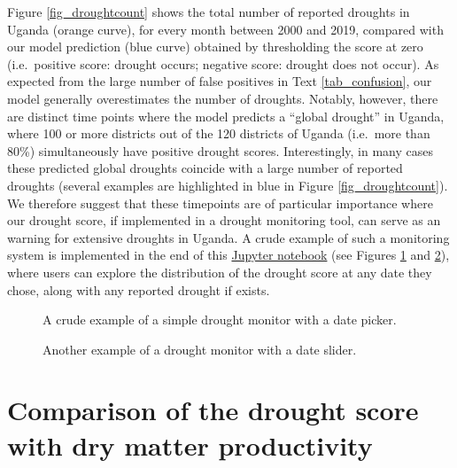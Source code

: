 \documentclass[10pt,parskip=half,
toc=sectionentrywithdots,
bibliography=totocnumbered,
captions=tableheading,numbers=noendperiod]{scrartcl}
\begin{document}
Figure \ref{fig_droughtcount} shows the total number of reported
droughts in Uganda (orange curve), for every month between 2000 and
2019, compared with our model prediction (blue curve) obtained by
thresholding the score at zero (i.e.~positive score: drought occurs;
negative score: drought does not occur). As expected from the large
number of false positives in Text \ref{tab_confusion}, our model
generally overestimates the number of droughts. Notably, however, there
are distinct time points where the model predicts a ``global drought''
in Uganda, where 100 or more districts out of the 120 districts of
Uganda (i.e.~more than 80\%) simultaneously have positive drought
scores. Interestingly, in many cases these predicted global droughts
coincide with a large number of reported droughts (several examples are
highlighted in blue in Figure \ref{fig_droughtcount}). We therefore
suggest that these timepoints are of particular importance where our
drought score, if implemented in a drought monitoring tool, can serve as
an warning for extensive droughts in Uganda. A crude example of such a
monitoring system is implemented in the end of this
\href{https://github.com/rodekruis/IBF-system/blob/master/trigger-model-development/drought/skill-assessment/Model\%20Event\%20Data/Uganda_logit_model.ipynb}{Jupyter
notebook} (see Figures \ref{fig_monitor} and \ref{fig_monitor_2}), where
users can explore the distribution of the drought score at any date they
chose, along with any reported drought if exists.

\begin{figure}[H]
\hypertarget{fig_monitor}{%
\begin{center}
\end{center}
\caption{A crude example of a simple drought monitor with a date picker.}\label{fig_monitor}
}
\end{figure}

\begin{figure}[H]
\hypertarget{fig_monitor_2}{%
\begin{center}
\end{center}
\caption{Another example of a drought monitor with a date slider.}\label{fig_monitor_2}
}
\end{figure}

\hypertarget{comparison-of-the-drought-score-with-dry-matter-productivity}{%
\section{Comparison of the drought score with dry matter
productivity}\label{comparison-of-the-drought-score-with-dry-matter-productivity}}
\end{document}

